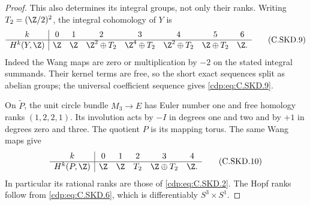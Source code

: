 \begin{proof}
This also determines its integral groups,
not only their ranks. Writing $T_2=(\Z/2)^2$,
the integral cohomology of $Y$ is
\[
 \begin{array}{c|ccccccc}
 k&0&1&2&3&4&5&6\\ \hline
 H^k(Y,\Z)&
 \Z&\Z&\Z^2\oplus T_2&\Z^4\oplus T_2&
 \Z^2\oplus T_2&\Z\oplus T_2&\Z .
 \end{array}                                             \tag{C.SKD.9}\label{cdp:eq:C.SKD.9}
\]
Indeed the Wang maps are zero or multiplication
by $-2$ on the stated integral summands.
Their kernel terms are free, so the short
exact sequences split as abelian groups;
the universal coefficient sequence gives
\eqref{cdp:eq:C.SKD.9}.

On $\widetilde P$, the unit circle bundle
$M_3\to E$ has Euler number one and free
homology ranks $(1,2,2,1)$. Its involution
acts by $-I$ in degrees one and two and
by $+1$ in degrees zero and three.
The quotient $P$ is its mapping torus.
The same Wang maps give
\[
 \begin{array}{c|ccccc}
 k&0&1&2&3&4\\ \hline
 H^k(P,\Z)&
 \Z&\Z&T_2&\Z\oplus T_2&\Z .
 \end{array}                                             \tag{C.SKD.10}\label{cdp:eq:C.SKD.10}
\]
In particular its rational ranks are those
of \eqref{cdp:eq:C.SKD.2}. The Hopf ranks follow from
\eqref{cdp:eq:C.SKD.6}, which is differentiably
$S^3\times S^1$.


\end{proof}
